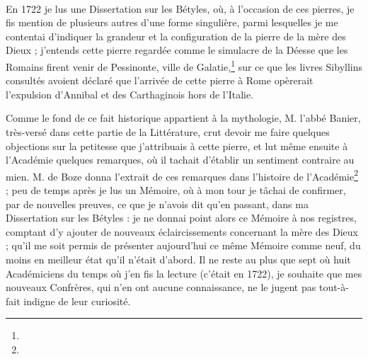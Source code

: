 \documentclass[a4paper, 11pt, oneside, polutonikogreek, french]{article}
\begin{document}
\paragraph{}
En 1722 je lus une Dissertation sur les Bétyles, où, à l'occasion de ces pierres, je fis mention de plusieurs autres d'une forme singulière, parmi lesquelles je me contentai d'indiquer la grandeur et la configuration de la pierre de la mère des Dieux ; j'entends cette pierre regardée comme le simulacre de la Déesse que les Romains firent venir de Pessinonte, ville de Galatie,\footnote{} sur ce que les livres Sibyllins consultés avoient déclaré que l'arrivée de cette pierre à Rome opèrerait l'expulsion d'Annibal et des Carthaginois hors de l'Italie.

Comme le fond de ce fait historique appartient à la mythologie, M. l'abbé Banier, très-versé dans cette partie de la Littérature, crut devoir me faire quelques objections sur la petitesse que j'attribuais à cette pierre, et lut même ensuite à l'Académie quelques remarques, où il tachait d'établir un sentiment contraire au mien. M. de Boze donna l'extrait de ces remarques dans l'histoire de l'Académie\footnote{} ; peu de temps après je lus un Mémoire, où à mon tour je tâchai de confirmer, par de nouvelles preuves, ce que je n'avois dit qu'en passant, dans ma Dissertation sur les Bétyles : je ne donnai point alors ce Mémoire à nos registres, comptant d'y ajouter de nouveaux éclaircissements concernant la mère des Dieux ; qu'il me soit permis de présenter aujourd'hui ce même Mémoire comme neuf, du moins en meilleur état qu'il n'était d'abord. Il ne reste au plus que sept où huit Académiciens du temps où j'en fis la lecture (c'était en 1722), je souhaite que mes nouveaux Confrères, qui n'en ont aucune connaissance, ne le jugent pas tout-à-fait indigne de leur curiosité.
\end{document}
